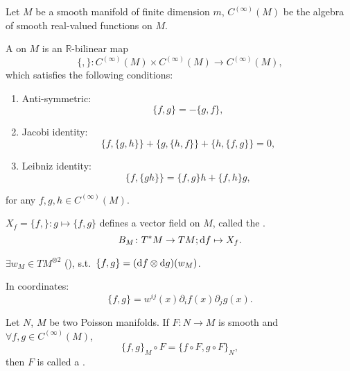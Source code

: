 \documentclass[openany, a5paper]{book}
\begin{document}
\begin{definition}
	Let $M$ be a smooth manifold of finite dimension $m$, 
	$C^{(\infty)}(M)$ be the algebra of smooth real-valued functions on $M$.

	A  on $M$ is an $\mathbb R$-bilinear map
	\begin{equation}
		\{, \} \colon C^{(\infty)}(M) \times C^{(\infty)}(M) \to C^{(\infty)}(M),
	\end{equation}
	which satisfies the following conditions:
	\begin{enumerate}
		\item Anti-symmetric:
		\begin{equation}
			\{f, g\} = -\{g, f\},
		\end{equation}
		\item Jacobi identity:
		\begin{equation}
			\{f, \{g, h\}\} + \{g, \{h, f\}\} + \{h, \{f, g\}\} = 0,
		\end{equation}
		\item Leibniz identity:
		\begin{equation}
			\{f, \{gh\}\} = \{f, g\} h + \{f, h\} g,
		\end{equation}
	\end{enumerate}
	for any $f, g, h \in C^{(\infty)}(M)$.
\end{definition}

$X_f = \{f, \} \colon g \mapsto \{f, g\}$ defines a vector field on $M$, called the .
\begin{equation}
	B_M \colon T^*M \to TM; \mathrm{d} f \mapsto X_f.
\end{equation}

$\exists w_M \in TM^{\otimes 2}$ (), s.t.\ $\{f, g\} = (\mathrm{d} f \otimes \mathrm{d} g)(w_M)$.

In coordinates:
\begin{equation}
	\{f, g\} = w^{ij}(x) \partial_i f(x) \partial_j g(x).
\end{equation}

\begin{definition}
	Let $N$, $M$ be two Poisson manifolds.
	If $F \colon N \to M$ is smooth and $\forall f, g \in C^{(\infty)}(M)$,
	\begin{equation}
		\{f, g\}_M \circ F = \{f \circ F, g \circ F\}_N,
	\end{equation}
	then $F$ is called a .
\end{definition}
\end{document}
